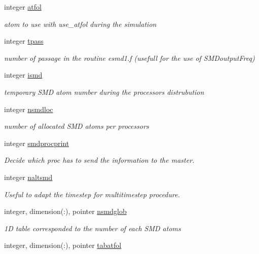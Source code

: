 \begin{DoxyCompactItemize}
integer \hyperlink{classmsmd_a227412ce8c92691533ff296b74dfde92}{atfol}
\begin{DoxyCompactList}\small\item\em atom to use with use\-\_\-atfol during the simulation \end{DoxyCompactList}\item 
integer \hyperlink{classmsmd_ac03367ffce116ce017105ef8fae32422}{tpass}
\begin{DoxyCompactList}\small\item\em number of passage in the routine esmd1.\-f (usefull for the use of S\-M\-Doutput\-Freq) \end{DoxyCompactList}\item 
integer \hyperlink{classmsmd_ac6ff7790f7826383a90213add5efe1ff}{ismd}
\begin{DoxyCompactList}\small\item\em temporary S\-M\-D atom number during the processors distrubution \end{DoxyCompactList}\item 
integer \hyperlink{classmsmd_a3d82fa00829c2cca7bfff321c83f579b}{nsmdloc}
\begin{DoxyCompactList}\small\item\em number of allocated S\-M\-D atoms per processors \end{DoxyCompactList}\item 
integer \hyperlink{classmsmd_a8f356834ac2c3a70a860a4e993eb3b1d}{smdprocprint}
\begin{DoxyCompactList}\small\item\em Decide which proc has to send the information to the master. \end{DoxyCompactList}\item 
integer \hyperlink{classmsmd_acbf4807f1ce56dff3f6e6b1f60642586}{naltsmd}
\begin{DoxyCompactList}\small\item\em Useful to adapt the timestep for multitimestep procedure. \end{DoxyCompactList}\item 
integer, dimension(\-:), pointer \hyperlink{classmsmd_a904292a72123ef4d6f6bc89188e84553}{nsmdglob}
\begin{DoxyCompactList}\small\item\em 1\-D table corresponded to the number of each S\-M\-D atoms \end{DoxyCompactList}\item 
integer, dimension(\-:), pointer \hyperlink{classmsmd_acd0d6c7087206d9032bb505cc1ddb03a}{tabatfol}

\end{DoxyCompactItemize}

